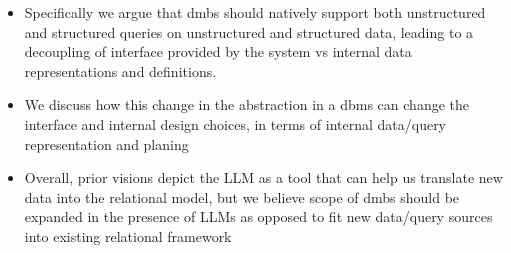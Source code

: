 \begin{itemize}
\item Specifically we argue that dmbs should natively support both unstructured and structured queries on unstructured and structured data, leading to a decoupling of interface provided by the system vs internal data representations and definitions. 
\item We discuss how this change in the abstraction in a dbms can change the interface and internal design choices, in terms of internal data/query representation and planing
\item Overall, prior visions depict the LLM as a tool that can help us translate new data into the relational model, but we believe scope of dmbs should be expanded in the presence of LLMs as opposed to fit new data/query sources into existing relational framework
\end{itemize}

\fi
